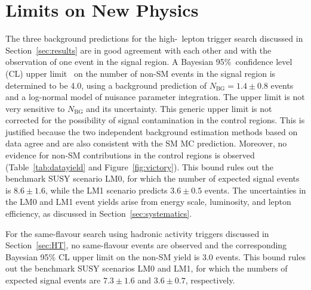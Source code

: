 \section{Limits on New Physics}
\label{sec:limit}




The three background predictions for the high-\pt\ lepton trigger search
discussed in Section~\ref{sec:results} are in good agreement with each other and
with the observation of one event in the signal region. 
A Bayesian 95\%~confidence level (CL) upper limit~\cite{ref:cl95cms}  on the number of
non-SM events in the signal region is determined to be 4.0,
using a background prediction of $N_\textrm{BG} = 1.4 \pm 0.8$
events and a log-normal model of nuisance parameter integration.
The upper limit is not very sensitive to $N_\textrm{BG}$ and its uncertainty.
This generic upper limit is not corrected for the possibility
of signal contamination in the control regions. This is justified because
the two independent background estimation methods based on data agree
and are also consistent with the SM MC prediction.
Moreover,  no evidence for non-SM contributions in
the control regions is observed (Table~\ref{tab:datayield} and Figure~\ref{fig:victory}). 
This bound rules out the benchmark SUSY scenario LM0, for which the
number of expected signal events is $8.6 \pm 1.6$, while the LM1 scenario predicts
$3.6 \pm 0.5$ events.
The uncertainties in the LM0 and LM1 event yields arise from energy scale, luminosity, 
and lepton efficiency, as discussed in Section~\ref{sec:systematics}.

For the same-flavour search using hadronic activity triggers discussed in Section~\ref{sec:HT}, 
no same-flavour events are observed and the corresponding Bayesian 95\% CL upper limit on the 
non-SM yield is 3.0 events. 
This bound rules out the benchmark SUSY scenarios LM0 and LM1, for which the
numbers of expected signal events are $7.3 \pm 1.6$ and $3.6 \pm 0.7$, respectively.

